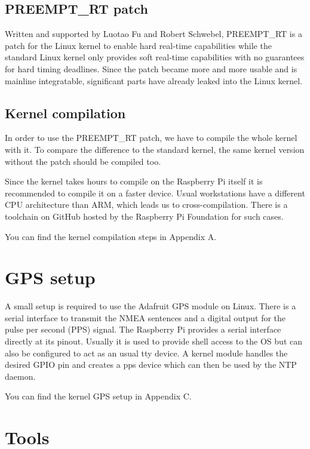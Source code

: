 \subsection{PREEMPT\_RT patch}

Written and supported by Luotao Fu and Robert Schwebel, PREEMPT\_RT is a patch for the Linux kernel to enable hard real-time capabilities while the standard Linux kernel only provides soft real-time capabilities with no guarantees for hard timing deadlines. Since the patch became more and more usable and is mainline integratable, significant parts have already leaked into the Linux kernel.

\subsection{Kernel compilation}

In order to use the PREEMPT\_RT patch, we have to compile the whole kernel with it. To compare the difference to the standard kernel, the same kernel version without the patch should be compiled too.

Since the kernel takes hours to compile on the Raspberry Pi itself it is recommended to compile it on a faster device. Usual workstations have a different CPU architecture than ARM, which leads us to cross-compilation. There is a toolchain on GitHub hosted by the Raspberry Pi Foundation for such cases.

You can find the kernel compilation steps in Appendix A.

\section{GPS setup}

A small setup is required to use the Adafruit GPS module on Linux. There is a serial interface to transmit the NMEA sentences and a digital output for the pulse per second (PPS) signal. The Raspberry Pi provides a serial interface directly at its pinout. Usually it is used to provide shell access to the OS but can also be configured to act as an usual tty device. A kernel module handles the desired GPIO pin and creates a pps device which can then be used by the NTP daemon.

You can find the kernel GPS setup in Appendix C.

\section{Tools}

